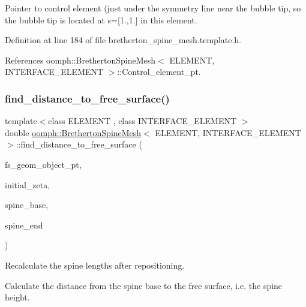 Pointer to control element (just under the symmetry line near the bubble tip, so the bubble tip is located at s=\mbox{[}1.,1.\mbox{]} in this element. 



Definition at line 184 of file bretherton\+\_\+spine\+\_\+mesh.\+template.\+h.



References oomph\+::\+Bretherton\+Spine\+Mesh$<$ E\+L\+E\+M\+E\+N\+T, I\+N\+T\+E\+R\+F\+A\+C\+E\+\_\+\+E\+L\+E\+M\+E\+N\+T $>$\+::\+Control\+\_\+element\+\_\+pt.

\mbox{\label{classoomph_1_1BrethertonSpineMesh_ac80488ae4db2da00e1b38f6f07e0ff9d}} 
\subsubsection{\texorpdfstring{find\+\_\+distance\+\_\+to\+\_\+free\+\_\+surface()}{find\_distance\_to\_free\_surface()}}
{\footnotesize\ttfamily template$<$class E\+L\+E\+M\+E\+NT , class I\+N\+T\+E\+R\+F\+A\+C\+E\+\_\+\+E\+L\+E\+M\+E\+NT $>$ \\
double \hyperlink{classoomph_1_1BrethertonSpineMesh}{oomph\+::\+Bretherton\+Spine\+Mesh}$<$ E\+L\+E\+M\+E\+NT, I\+N\+T\+E\+R\+F\+A\+C\+E\+\_\+\+E\+L\+E\+M\+E\+NT $>$\+::find\+\_\+distance\+\_\+to\+\_\+free\+\_\+surface (\begin{DoxyParamCaption}\item[{Geom\+Object $\ast$const \&}]{fs\+\_\+geom\+\_\+object\+\_\+pt,  }\item[{Vector$<$ double $>$ \&}]{initial\+\_\+zeta,  }\item[{const Vector$<$ double $>$ \&}]{spine\+\_\+base,  }\item[{const Vector$<$ double $>$ \&}]{spine\+\_\+end }\end{DoxyParamCaption})}



Recalculate the spine lengths after repositioning. 

Calculate the distance from the spine base to the free surface, i.\+e. the spine height. 


